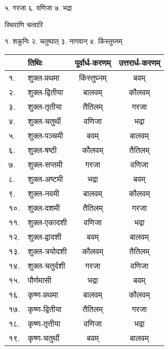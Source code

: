 ५. गरजा \hspace{2ex} ६. वणिजा  \hspace{2ex}७. भद्रा

{स्थिराणि चत्वारि}

१. शकुनिः \hspace{2ex} २. चतुष्पात् \hspace{2ex} ३. नागवान् \hspace{2ex} ४. किंस्तुघ्नम्

\pagebreak[4]

\begingroup
\small
\begin{longtable}{llcc}
  & तिथिः       & पूर्वार्ध-करणम् & उत्तरार्ध-करणम् \\\endhead
  १.  & शुक्ल-प्रथमा   & किंस्तुघ्नम्     & बवम्          \\
  २.  & शुक्ल-द्वितीया & बालवम्       & कौलवम्        \\
  ३.  & शुक्ल-तृतीया   & तैतिलम्       & गरजा         \\
  ४.  & शुक्ल-चतुर्थी   & वणिजा       & भद्रा         \\
  ५.  & शुक्ल-पञ्चमी   & बवम्         & बालवम्        \\
  ६.  & शुक्ल-षष्ठी    & कौलवम्       & तैतिलम्        \\
  ७.  & शुक्ल-सप्तमी   & गरजा        & वणिजा        \\
  ८.  & शुक्ल-अष्टमी   & भद्रा        & बवम्          \\
  ९.  & शुक्ल-नवमी    & बालवम्       & कौलवम्        \\
  १०. & शुक्ल-दशमी    & तैतिलम्       & गरजा         \\
  ११. & शुक्ल-एकादशी  & वणिजा       & भद्रा         \\
  १२. & शुक्ल-द्वादशी  & बवम्         & बालवम्        \\
  १३. & शुक्ल-त्रयोदशी & कौलवम्       & तैतिलम्        \\
  १४. & शुक्ल-चतुर्दशी  & गरजा        & वणिजा        \\
  १५. & पौर्णमासी    & भद्रा        & बवम्          \\
  १६. & कृष्ण-प्रथमा   & बालवम्       & कौलवम्        \\
  १७. & कृष्ण-द्वितीया & तैतिलम्       & गरजा         \\
  १८. & कृष्ण-तृतीया   & वणिजा       & भद्रा         \\
  १९. & कृष्ण-चतुर्थी   & बवम्         & बालवम्        \\

\end{longtable}

